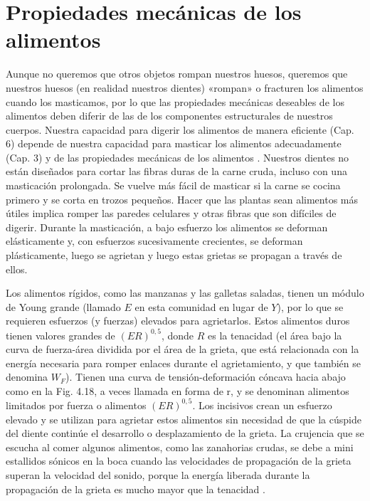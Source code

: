 \documentclass[12pt]{book}
\begin{document}
\section{Propiedades mecánicas de los alimentos}

Aunque no queremos que otros objetos rompan nuestros huesos, queremos que nuestros huesos (en realidad nuestros dientes) «rompan» o fracturen los alimentos cuando los masticamos, por lo que las propiedades mecánicas deseables de los alimentos deben diferir de las de los componentes estructurales de nuestros cuerpos. Nuestra capacidad para digerir los alimentos de manera eficiente (Cap. 6) depende de nuestra capacidad para masticar los alimentos adecuadamente (Cap. 3) y de las propiedades mecánicas de los alimentos \cite{41,43}. Nuestros dientes no están diseñados para cortar las fibras duras de la carne cruda, incluso con una masticación prolongada. Se vuelve más fácil de masticar si la carne se cocina primero y se corta en trozos pequeños. Hacer que las plantas sean alimentos más útiles implica romper las paredes celulares y otras fibras que son difíciles de digerir. Durante la masticación, a bajo esfuerzo los alimentos se deforman elásticamente y, con esfuerzos sucesivamente crecientes, se deforman plásticamente, luego se agrietan y luego estas grietas se propagan a través de ellos.

Los alimentos rígidos, como las manzanas y las galletas saladas, tienen un módulo de Young grande (llamado $E$ en esta comunidad en lugar de $Y$), por lo que se requieren esfuerzos (y fuerzas) elevados para agrietarlos. Estos alimentos duros tienen valores grandes de $(ER)^{0,5}$, donde $R$ es la tenacidad (el área bajo la curva de fuerza-área dividida por el área de la grieta, que está relacionada con la energía necesaria para romper enlaces durante el agrietamiento, y que también se denomina $W_F$). Tienen una curva de tensión-deformación cóncava hacia abajo como en la Fig. 4.18, a veces llamada en forma de r, y se denominan alimentos limitados por fuerza o alimentos $(ER)^{0,5}$. Los incisivos crean un esfuerzo elevado y se utilizan para agrietar estos alimentos sin necesidad de que la cúspide del diente continúe el desarrollo o desplazamiento de la grieta. La crujencia que se escucha al comer algunos alimentos, como las zanahorias crudas, se debe a mini estallidos sónicos en la boca cuando las velocidades de propagación de la grieta superan la velocidad del sonido, porque la energía liberada durante la propagación de la grieta es mucho mayor que la tenacidad \cite{65,67,76}.
\end{document}
